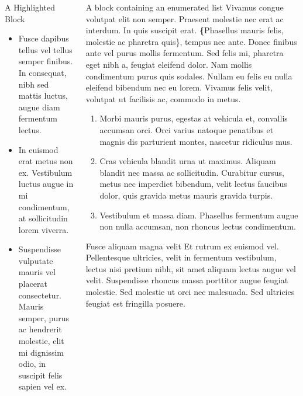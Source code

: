 \documentclass[final]{beamer}
\newlength{\sepwidth}
\newlength{\colwidth}
\newcommand{\separatorcolumn}{\begin{column}{\sepwidth}\end{column}}
\begin{document}
\begin{frame}[label={sec:orgc24fd89}]{}
\begin{block}{}
\begin{columns}
\begin{column}{\colwidth\columnwidth}
\begin{alertblock}{A Highlighted Block}
\begin{itemize}
\item \alert{Fusce dapibus tellus} vel tellus semper finibus. In consequat, nibh sed
mattis luctus, augue diam fermentum lectus.
\item \alert{In euismod erat metus} non ex. Vestibulum luctus augue in
mi condimentum, at sollicitudin lorem viverra.
\item \alert{Suspendisse vulputate} mauris vel placerat consectetur.  Mauris semper, purus
ac hendrerit molestie, elit mi dignissim odio, in suscipit felis sapien vel
ex.
\end{itemize}

\separatorcolumn
\end{alertblock}
\end{column}

\begin{column}{\colwidth\columnwidth}
\begin{block}{A block containing an enumerated list}
Vivamus congue volutpat elit non semper. Praesent molestie nec erat ac
interdum. In quis suscipit erat. \textbf\{Phasellus mauris felis, molestie
ac pharetra quis\}, tempus nec ante. Donec finibus ante vel purus mollis
fermentum. Sed felis mi, pharetra eget nibh a, feugiat eleifend dolor. Nam
mollis condimentum purus quis sodales. Nullam eu felis eu nulla eleifend
bibendum nec eu lorem. Vivamus felis velit, volutpat ut facilisis ac,
commodo in metus.

\begin{enumerate}
\item \alert{Morbi mauris purus}, egestas at vehicula et, convallis accumsan orci. Orci
varius natoque penatibus et magnis dis parturient montes, nascetur ridiculus
mus.
\item \alert{Cras vehicula blandit urna ut maximus}. Aliquam blandit nec massa ac
sollicitudin. Curabitur cursus, metus nec imperdiet bibendum, velit lectus
faucibus dolor, quis gravida metus mauris gravida turpis.
\item \alert{Vestibulum et massa diam}. Phasellus fermentum augue non nulla accumsan, non
rhoncus lectus condimentum.
\end{enumerate}
\end{block}

\begin{block}{Fusce aliquam magna velit}
Et rutrum ex euismod vel. Pellentesque ultricies, velit in fermentum
vestibulum, lectus nisi pretium nibh, sit amet aliquam lectus augue vel
velit. Suspendisse rhoncus massa porttitor augue feugiat molestie. Sed
molestie ut orci nec malesuada. Sed ultricies feugiat est fringilla
posuere.


\end{block}
\end{column}
\end{columns}
\end{block}
\end{frame}
\end{document}

